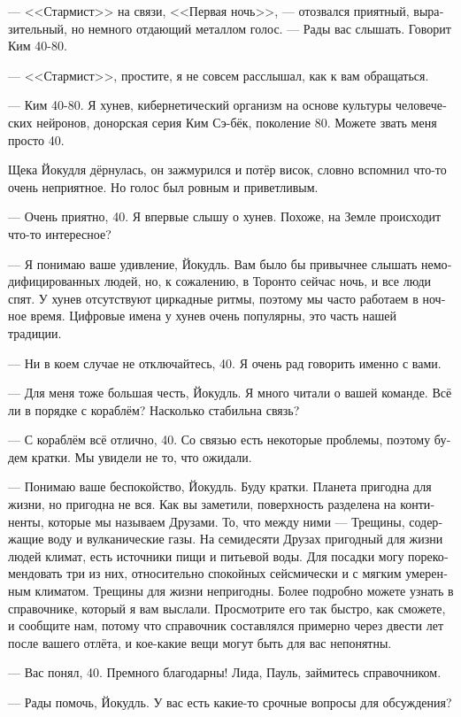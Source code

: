 \documentclass[a4paper,12pt,fleqn]{book}\usepackage{polyglossia}\setdefaultlanguage[babelshorthands=true]{russian}\setotherlanguage{english}\defaultfontfeatures{Ligatures=TeX,Mapping=tex-text}\usepackage{xcolor}\newcommand{\ml}[3]{#2}
\begin{document}
--- <<Стармист>> на связи, <<Первая ночь>>, --- отозвался приятный, выразительный, но немного отдающий металлом голос.
--- Рады вас слышать.
Говорит Ким 40-80.

--- <<Стармист>>, простите, я не совсем расслышал, как к вам обращаться.

--- Ким 40-80.
Я хунев, кибернетический организм на основе культуры человеческих нейронов, донорская серия Ким Сэ-бёк, поколение 80. %
Можете звать меня просто 40.

Щека Йокудля дёрнулась, он зажмурился и потёр висок, словно вспомнил что-то очень неприятное.
Но голос был ровным и приветливым.

--- Очень приятно, 40.
Я впервые слышу о хунев.
Похоже, на Земле происходит что-то интересное?

--- Я понимаю ваше удивление, Йокудль.
Вам было бы привычнее слышать немодифицированных людей, но, к сожалению, в Торонто сейчас ночь, и все люди спят.
У хунев отсутствуют циркадные ритмы, поэтому мы часто работаем в ночное время.
Цифровые имена у хунев очень популярны, это часть нашей традиции.

--- Ни в коем случае не отключайтесь, 40.
Я очень рад говорить именно с вами.

--- Для меня тоже большая честь, Йокудль.
Я много читали о вашей команде.
Всё ли в порядке с кораблём?
Насколько стабильна связь?

--- С кораблём всё отлично, 40.
Со связью есть некоторые проблемы, поэтому будем кратки.
Мы увидели не то, что ожидали.

--- Понимаю ваше беспокойство, Йокудль.
Буду кратки.
Планета пригодна для жизни, но пригодна не вся.
Как вы заметили, поверхность разделена на континенты, которые мы называем Друзами.
То, что между ними --- Трещины, содержащие воду и вулканические газы.
На семидесяти Друзах пригодный для жизни людей климат, есть источники пищи и питьевой воды.
Для посадки могу порекомендовать три из них, относительно спокойных сейсмически и с мягким умеренным климатом.
Трещины для жизни непригодны.
Более подробно можете узнать в справочнике, который я вам выслали.
Просмотрите его так быстро, как сможете, и сообщите нам, потому что справочник составлялся примерно через двести лет после вашего отлёта, и кое-какие вещи могут быть для вас непонятны.

--- Вас понял, 40.
Премного благодарны!
Лида, Пауль, займитесь справочником.

--- Рады помочь, Йокудль.
У вас есть какие-то срочные вопросы для обсуждения?
\end{document}
